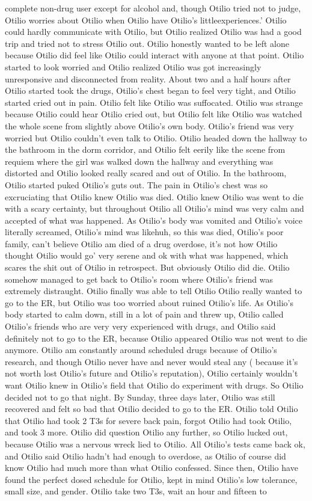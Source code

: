 \documentclass[12pt]{book}
\begin{document}
complete non-drug user except for alcohol and, though Otilio tried not to judge, Otilio worries about Otilio when Otilio have Otilio's littleexperiences.' Otilio could hardly communicate with Otilio, but Otilio realized Otilio was had a good trip and tried not to stress Otilio out. Otilio honestly wanted to be left alone because Otilio did feel like Otilio could interact with anyone at that point. Otilio started to look worried and Otilio realized Otilio was got increasingly unresponsive and disconnected from reality. About two and a half hours after Otilio started took the drugs, Otilio's chest began to feel very tight, and Otilio started cried out in pain. Otilio felt like Otilio was suffocated. Otilio was strange because Otilio could hear Otilio cried out, but Otilio felt like Otilio was watched the whole scene from slightly above Otilio's own body. Otilio's friend was very worried but Otilio couldn't even talk to Otilio. Otilio headed down the hallway to the bathroom in the dorm corridor, and Otilio felt eerily like the scene from requiem where the girl was walked down the hallway and everything was distorted and Otilio looked really scared and out of Otilio. In the bathroom, Otilio started puked Otilio's guts out. The pain in Otilio's chest was so excruciating that Otilio knew Otilio was died. Otilio knew Otilio was went to die with a scary certainty, but throughout Otilio all Otilio's mind was very calm and accepted of what was happened. As Otilio's body was vomited and Otilio's voice literally screamed, Otilio's mind was likehuh, so this was died, Otilio's poor family, can't believe Otilio am died of a drug overdose, it's not how Otilio thought Otilio would go' very serene and ok with what was happened, which scares the shit out of Otilio in retrospect. But obviously Otilio did die. Otilio somehow managed to get back to Otilio's room where Otilio's friend was extremely distraught. Otilio finally was able to tell Otilio Otilio really wanted to go to the ER, but Otilio was too worried about ruined Otilio's life. As Otilio's body started to calm down, still in a lot of pain and threw up, Otilio called Otilio's friends who are very very experienced with drugs, and Otilio said definitely not to go to the ER, because Otilio appeared Otilio was not went to die anymore. Otilio am constantly around scheduled drugs because of Otilio's research, and though Otilio never have and never would steal any ( because it's not worth lost Otilio's future and Otilio's reputation), Otilio certainly wouldn't want Otilio knew in Otilio's field that Otilio do experiment with drugs. So Otilio decided not to go that night. By Sunday, three days later, Otilio was still recovered and felt so bad that Otilio decided to go to the ER. Otilio told Otilio that Otilio had took 2 T3s for severe back pain, forgot Otilio had took Otilio, and took 3 more. Otilio did question Otilio any further, so Otilio lucked out, because Otilio was a nervous wreck lied to Otilio. All Otilio's tests came back ok, and Otilio said Otilio hadn't had enough to overdose, as Otilio of course did know Otilio had much more than what Otilio confessed. Since then, Otilio have found the perfect dosed schedule for Otilio, kept in mind Otilio's low tolerance, small size, and gender. Otilio take two T3s, wait an hour and fifteen to 
\end{document}

